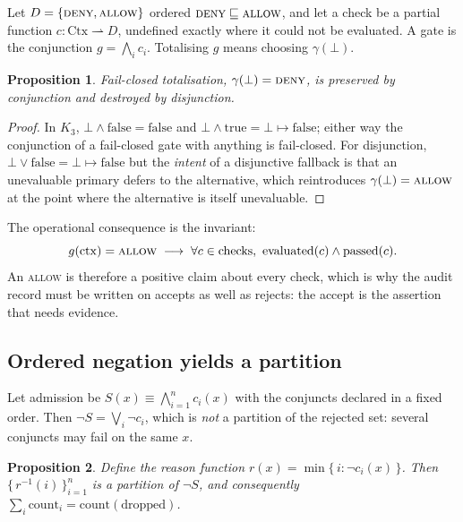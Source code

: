 \documentclass[11pt]{article}
\newtheorem{prop}{Proposition}[section]
\begin{document}
Let $D = \{\textsc{deny}, \textsc{allow}\}$ ordered $\textsc{deny} \sqsubseteq
\textsc{allow}$, and let a check be a partial function $c : \mathrm{Ctx}
\rightharpoonup D$, undefined exactly where it could not be evaluated. A gate is
the conjunction $g = \bigwedge_{i} c_i$. Totalising $g$ means choosing
$\gamma(\bot)$.

\begin{prop}
Fail-closed totalisation, $\gamma(\bot) = \textnormal{\textsc{deny}}$, is preserved by
conjunction and destroyed by disjunction.
\end{prop}

\begin{proof}
In $K_3$, $\bot \wedge \mathrm{false} = \mathrm{false}$ and $\bot \wedge
\mathrm{true} = \bot \mapsto \mathrm{false}$; either way the conjunction of a
fail-closed gate with anything is fail-closed. For disjunction, $\bot \vee
\mathrm{false} = \bot \mapsto \mathrm{false}$ but the \emph{intent} of a
disjunctive fallback is that an unevaluable primary defers to the alternative,
which reintroduces $\gamma(\bot) = \textsc{allow}$ at the point where the
alternative is itself unevaluable.
\end{proof}

The operational consequence is the invariant:
\begin{equation}
g(\mathrm{ctx}) = \textsc{allow} \;\longrightarrow\; \forall c \in
\mathrm{checks},\ \mathrm{evaluated}(c) \wedge \mathrm{passed}(c).
\end{equation}
An \textsc{allow} is therefore a positive claim about every check, which is why
the audit record must be written on accepts as well as rejects: the accept is
the assertion that needs evidence.

\subsection{Ordered negation yields a partition}
\label{lbl:HS-GATE-02}

Let admission be $S(x) \equiv \bigwedge_{i=1}^{n} c_i(x)$ with the conjuncts
declared in a fixed order. Then $\neg S = \bigvee_i \neg c_i$, which is
\emph{not} a partition of the rejected set: several conjuncts may fail on the
same $x$.

\begin{prop}
Define the reason function $r(x) = \min\{\, i : \neg c_i(x) \,\}$. Then
$\{\, r^{-1}(i) \,\}_{i=1}^{n}$ is a partition of $\neg S$, and consequently
$\sum_i \mathrm{count}_i = \mathrm{count}(\text{dropped})$.
\end{prop}
\end{document}
